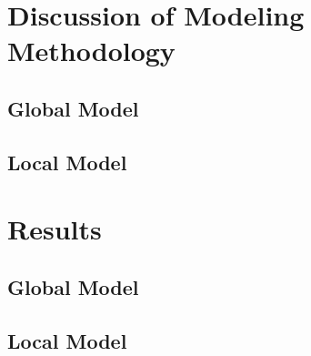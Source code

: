 \section{Discussion of Modeling Methodology}
\subsection{Global Model}
 
 
\subsection{Local Model}

\section{Results}

\subsection{Global Model}


\subsection{Local Model}
 